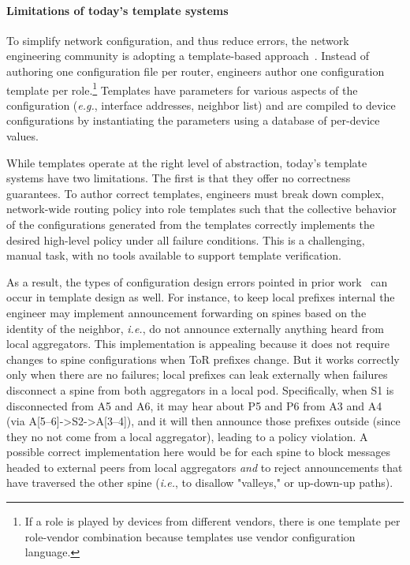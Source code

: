 \documentclass{sig-alternate-10pt}
\newcommand{\EG}{\emph{e.g.}}
\newcommand{\IE}{\emph{i.e.}}
\begin{document}
\paragraph*{Limitations of today's template systems}

To simplify network configuration, and thus reduce errors, the network engineering community is adopting a template-based approach~\cite{hatch,thwack}. Instead of authoring one configuration file per router, engineers author one configuration template per role.\footnote{If a role is played by devices from different vendors, there is one template per role-vendor combination because templates use vendor configuration language.} Templates have parameters for various aspects of the configuration (\EG, interface addresses, neighbor list) and are compiled to device configurations by instantiating the parameters using a database of per-device values.


While templates operate at the right level of abstraction, today's template systems have two limitations. The first is that they offer no correctness guarantees. To author correct templates, engineers must break down complex, network-wide routing policy into role templates such that the collective behavior of the configurations generated from the templates correctly implements the desired high-level policy under all failure conditions.  This is a challenging, manual task, with no tools available to support template verification.

As a result, the types of configuration design errors pointed in prior work~\cite{propane} can occur in template design as well. For instance, to keep local prefixes internal the engineer may implement announcement forwarding on spines based on the identity of the neighbor, \IE, do not announce externally anything heard from local aggregators. This implementation is appealing because it does not require changes to spine configurations when ToR prefixes change. But it works correctly only when there are no failures; local prefixes can leak externally when failures disconnect a spine from both aggregators in a local pod. Specifically, when S1 is disconnected from A5 and A6, it may hear about P5 and P6 from A3 and A4 (via A[5--6]->S2->A[3--4]), and it will then announce those prefixes outside (since they no not come from a local aggregator), leading to a policy violation. A possible correct implementation here would be for each spine to block messages headed to external peers from local aggregators {\em and} to reject announcements that have traversed the other spine (\IE, to disallow "valleys," or up-down-up paths).
\end{document}
